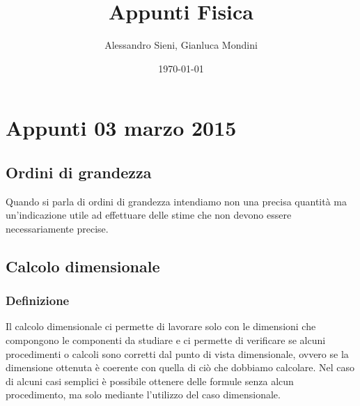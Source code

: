 \documentclass[portrait]{article}
\author{Alessandro Sieni, Gianluca Mondini}
\title{Appunti Fisica}
\date{\today}
\begin{document}
\maketitle
\newpage
\tableofcontents
\newpage
\section{Appunti 03 marzo 2015}
\subsection{Ordini di grandezza}
Quando si parla di ordini di grandezza intendiamo non una precisa quantità ma un'indicazione utile ad effettuare delle stime che non devono essere necessariamente precise.
\subsection{Calcolo dimensionale}
\subsubsection{Definizione}
Il calcolo dimensionale ci permette di lavorare solo con le dimensioni che compongono le componenti da studiare e ci permette di verificare se alcuni procedimenti o calcoli sono corretti dal punto di vista dimensionale, ovvero se la dimensione ottenuta è coerente con quella di ciò che dobbiamo calcolare.
Nel caso di alcuni casi semplici è possibile ottenere delle formule senza alcun procedimento, ma solo mediante l'utilizzo del caso dimensionale.
\end{document}
